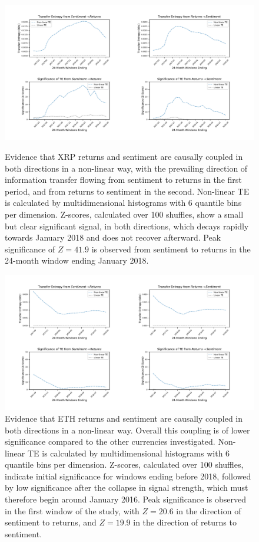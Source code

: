 \documentclass[]{rsos}%
\begin{document}
  \begin{figure}[!htbp]
    \includegraphics[width=\linewidth]{images/XRP.pdf}
    \caption{Evidence that XRP {\color{blue} returns} and sentiment are causally coupled in both directions in a non-linear way, with the prevailing direction of information transfer flowing from sentiment to {\color{blue} returns} in the first period, and from {\color{blue} returns} to sentiment in the second. Non-linear TE is calculated by multidimensional histograms with 6 quantile bins per dimension. Z-scores, calculated over 100 shuffles, show a small but clear significant signal, in both directions, which decays rapidly towards January 2018 and does not recover afterward. Peak significance of $Z=41.9$ is observed from sentiment to {\color{blue} returns} in the 24-month window ending January 2018.}
    \label{fig:XRP_TE}

    \includegraphics[width=\linewidth]{images/ETH.pdf} 
    \caption{Evidence that ETH {\color{blue} returns} and sentiment are causally coupled in both directions in a non-linear way. Overall this coupling is of lower significance compared to the other currencies investigated. Non-linear TE is calculated by multidimensional histograms with 6 quantile bins per dimension. Z-scores, calculated over 100 shuffles, indicate initial significance for windows ending before 2018, followed by low significance after the collapse in signal strength, which must therefore begin around January 2016. Peak significance is observed in the first window of the study, with $Z=20.6$ in the direction of sentiment to {\color{blue} returns}, and $Z=19.9$ in the direction of {\color{blue} returns} to sentiment.     
  }
  \label{fig:ETH_TE}
  \vspace{-34pt}
  \end{figure}
  
\end{document}

